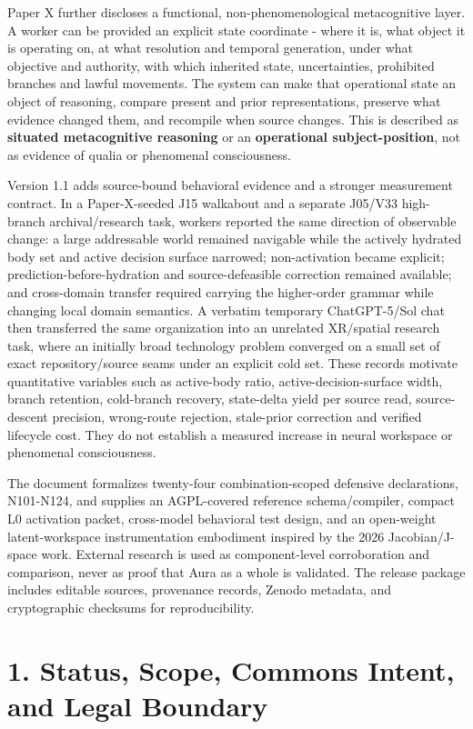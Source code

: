 \documentclass[
  10pt,
  letterpaper,
]{article}
\begin{document}
Paper X further discloses a functional, non-phenomenological
metacognitive layer. A worker can be provided an explicit state
coordinate - where it is, what object it is operating on, at what
resolution and temporal generation, under what objective and authority,
with which inherited state, uncertainties, prohibited branches and
lawful movements. The system can make that operational state an object
of reasoning, compare present and prior representations, preserve what
evidence changed them, and recompile when source changes. This is
described as \textbf{situated metacognitive reasoning} or an
\textbf{operational subject-position}, not as evidence of qualia or
phenomenal consciousness.

Version 1.1 adds source-bound behavioral evidence and a stronger
measurement contract. In a Paper-X-seeded J15 walkabout and a separate
J05/V33 high-branch archival/research task, workers reported the same
direction of observable change: a large addressable world remained
navigable while the actively hydrated body set and active decision
surface narrowed; non-activation became explicit;
prediction-before-hydration and source-defeasible correction remained
available; and cross-domain transfer required carrying the higher-order
grammar while changing local domain semantics. A verbatim temporary
ChatGPT-5/Sol chat then transferred the same organization into an
unrelated XR/spatial research task, where an initially broad technology
problem converged on a small set of exact repository/source seams under
an explicit cold set. These records motivate quantitative variables such
as active-body ratio, active-decision-surface width, branch retention,
cold-branch recovery, state-delta yield per source read, source-descent
precision, wrong-route rejection, stale-prior correction and verified
lifecycle cost. They do not establish a measured increase in neural
workspace or phenomenal consciousness.

The document formalizes twenty-four combination-scoped defensive
declarations, N101-N124, and supplies an AGPL-covered reference
schema/compiler, compact L0 activation packet, cross-model behavioral
test design, and an open-weight latent-workspace instrumentation
embodiment inspired by the 2026 Jacobian/J-space work. External research
is used as component-level corroboration and comparison, never as proof
that Aura as a whole is validated. The release package includes editable
sources, provenance records, Zenodo metadata, and cryptographic
checksums for reproducibility.

\section{1. Status, Scope, Commons Intent, and Legal
Boundary}\label{1-status-scope-commons-intent-and-legal-boundary}
\end{document}
